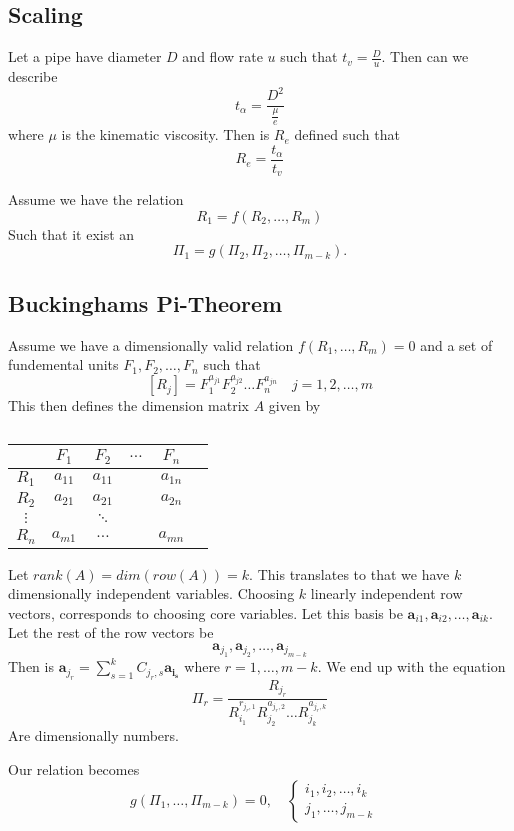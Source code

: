 \documentclass{article}
\theoremstyle{remark}
\begin{document}
\subsection{Scaling}%
\label{sub:scaling_2}

Let a pipe have diameter $D$ and flow rate $u$ such that $ t_{v} = \frac{D}{ u} $. Then can we describe \[
t_{\alpha } =  \frac{D^{2}}{ \frac{ \mu }{e} } 
\] 
where $\mu $ is the kinematic viscosity. Then is $R_{e} $ defined such that \[
R_{e} = \frac{t_{\alpha }}{ t_{v}} 
\]
\par
Assume we have the relation \[
R_{1} = f\left( R_{2}, \ldots, R_{m} \right)
\] 
Such that it exist an \[
\Pi _{1} = g\left( \Pi _{2}, \Pi _{2} , \ldots, \Pi _{m-k}  \right).
\] 
\subsection{Buckinghams Pi-Theorem}%
\label{sub:buckinghams_pi_theorem}

Assume we have a dimensionally valid relation $f\left( R_{1}, \ldots, R_{m} \right) = 0$ and a set of fundemental units $F_{1}, F_{2}, \ldots, F_{n}$ such that \[
\left[ R_{j} \right] = F_{1} ^{a_{j1}} F_{2} ^{a_{j2}} \ldots F_{n}^{a_{jn} } \quad  j = 1,2, \ldots, m 
\] 
This then defines the dimension matrix $A$ given by 

\begin{table}[htpb]
  \centering
  \caption{}
  \label{tab:label}
  \begin{tabular}{c | c c c c c}
  &  $F_{1}$ & $F_{2}$ & $\ldots$  & $F_{n}$ & \\ \hline
  $R_1$ &$a_{11}$  &$a_{11}$  &     & $a_{1n}$ &  \\
  $R_2$ &$a_{21}$  &$a_{21}$  &     &  $a_{2n}$ &  \\
  $\vdots$  &  & $\ddots$   &  &  \\
  $R_n$ &  $a_{m1}$ & $\ldots$   &  &  $a_{mn}$&
  \end{tabular}
\end{table}


Let $rank\left( A \right) = dim \left( row\left( A \right) \right) = k$. This translates to that we have $k$ dimensionally  independent variables. Choosing $k$ linearly independent row vectors, corresponds to choosing core variables. Let this basis be $\mathbf{a}_{i1}, \mathbf{a}_{i2}, \ldots , \mathbf{a}_{ik}$. Let the rest of the row vectors be \[
\mathbf{a}_{j_{1}} , \mathbf{a}_{j_{2}}, \ldots, \mathbf{a}_{j_{m-k}}
\] 
Then is $\mathbf{a}_{j_{r}} =  \sum_{s=1}^{k} C _{j_{r}, s} \mathbf{a_{i_{s}}}  $ where $r=  1, \ldots, m-k$. We end up with the equation \[
  \Pi _{r} = \frac{R_{j_{r}}}{ R_{i_{1}} ^{ r_{j_{r}, 1}} R_{j_{2}}^{a_{j_{r}, 2}} \ldots R_{j_{k}} ^{ a_{j_{r}, k}} } 
\] 
Are dimensionally numbers. \par Our relation becomes \[
g\left( \Pi _{1} , \ldots, \Pi _{m-k} \right) = 0, \quad \begin{cases}
  i_{1}, i_{2} , \ldots, i_{k}  &  \\
  j_{1} , \ldots, j_{m-k}
\end{cases} 
\] 
\end{document}
